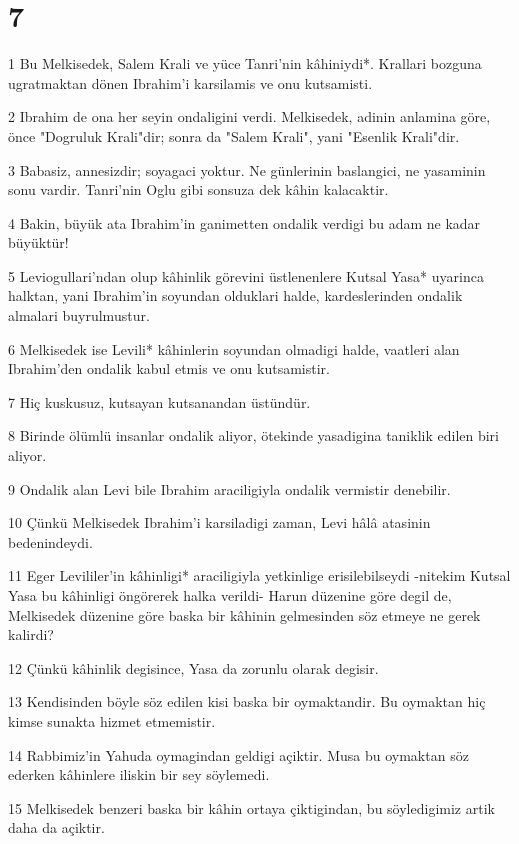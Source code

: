 \chapter{7}

\par 1 Bu Melkisedek, Salem Krali ve yüce Tanri'nin kâhiniydi*. Krallari bozguna ugratmaktan dönen Ibrahim'i karsilamis ve onu kutsamisti.
\par 2 Ibrahim de ona her seyin ondaligini verdi. Melkisedek, adinin anlamina göre, önce "Dogruluk Krali"dir; sonra da "Salem Krali", yani "Esenlik Krali"dir.
\par 3 Babasiz, annesizdir; soyagaci yoktur. Ne günlerinin baslangici, ne yasaminin sonu vardir. Tanri'nin Oglu gibi sonsuza dek kâhin kalacaktir.
\par 4 Bakin, büyük ata Ibrahim'in ganimetten ondalik verdigi bu adam ne kadar büyüktür!
\par 5 Leviogullari'ndan olup kâhinlik görevini üstlenenlere Kutsal Yasa* uyarinca halktan, yani Ibrahim'in soyundan olduklari halde, kardeslerinden ondalik almalari buyrulmustur.
\par 6 Melkisedek ise Levili* kâhinlerin soyundan olmadigi halde, vaatleri alan Ibrahim'den ondalik kabul etmis ve onu kutsamistir.
\par 7 Hiç kuskusuz, kutsayan kutsanandan üstündür.
\par 8 Birinde ölümlü insanlar ondalik aliyor, ötekinde yasadigina taniklik edilen biri aliyor.
\par 9 Ondalik alan Levi bile Ibrahim araciligiyla ondalik vermistir denebilir.
\par 10 Çünkü Melkisedek Ibrahim'i karsiladigi zaman, Levi hâlâ atasinin bedenindeydi.
\par 11 Eger Levililer'in kâhinligi* araciligiyla yetkinlige erisilebilseydi -nitekim Kutsal Yasa bu kâhinligi öngörerek halka verildi- Harun düzenine göre degil de, Melkisedek düzenine göre baska bir kâhinin gelmesinden söz etmeye ne gerek kalirdi?
\par 12 Çünkü kâhinlik degisince, Yasa da zorunlu olarak degisir.
\par 13 Kendisinden böyle söz edilen kisi baska bir oymaktandir. Bu oymaktan hiç kimse sunakta hizmet etmemistir.
\par 14 Rabbimiz'in Yahuda oymagindan geldigi açiktir. Musa bu oymaktan söz ederken kâhinlere iliskin bir sey söylemedi.
\par 15 Melkisedek benzeri baska bir kâhin ortaya çiktigindan, bu söyledigimiz artik daha da açiktir.
